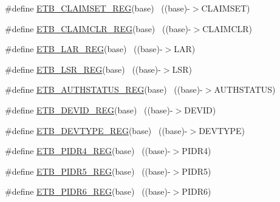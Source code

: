 \begin{DoxyCompactItemize}
\item 
\#define \hyperlink{group___e_t_b___register___accessor___macros_ga53774f9d5d7a5be087ae544a728f4402}{E\+T\+B\+\_\+\+C\+L\+A\+I\+M\+S\+E\+T\+\_\+\+R\+EG}(base)                                  ~((base)-\/$>$C\+L\+A\+I\+M\+S\+ET)
\item 
\#define \hyperlink{group___e_t_b___register___accessor___macros_gab07e0a6927dc1764c98232f6f99b3234}{E\+T\+B\+\_\+\+C\+L\+A\+I\+M\+C\+L\+R\+\_\+\+R\+EG}(base)                                  ~((base)-\/$>$C\+L\+A\+I\+M\+C\+LR)
\item 
\#define \hyperlink{group___e_t_b___register___accessor___macros_gac75124828507bbcd9df24ab8a4084709}{E\+T\+B\+\_\+\+L\+A\+R\+\_\+\+R\+EG}(base)                                            ~((base)-\/$>$L\+AR)
\item 
\#define \hyperlink{group___e_t_b___register___accessor___macros_gaca7b71b796d591bb249270a2af85ca23}{E\+T\+B\+\_\+\+L\+S\+R\+\_\+\+R\+EG}(base)                                            ~((base)-\/$>$L\+SR)
\item 
\#define \hyperlink{group___e_t_b___register___accessor___macros_gaa3258c2fe535e526cb4583178e67f1fc}{E\+T\+B\+\_\+\+A\+U\+T\+H\+S\+T\+A\+T\+U\+S\+\_\+\+R\+EG}(base)                              ~((base)-\/$>$A\+U\+T\+H\+S\+T\+A\+T\+US)
\item 
\#define \hyperlink{group___e_t_b___register___accessor___macros_gafa2a6c499747c9b7b95b97f0af8eead8}{E\+T\+B\+\_\+\+D\+E\+V\+I\+D\+\_\+\+R\+EG}(base)                                        ~((base)-\/$>$D\+E\+V\+ID)
\item 
\#define \hyperlink{group___e_t_b___register___accessor___macros_gac36252d853b0600a7aa961d72babf69c}{E\+T\+B\+\_\+\+D\+E\+V\+T\+Y\+P\+E\+\_\+\+R\+EG}(base)                                    ~((base)-\/$>$D\+E\+V\+T\+Y\+PE)
\item 
\#define \hyperlink{group___e_t_b___register___accessor___macros_gaabd66745bb19a195e8a4f40926b19608}{E\+T\+B\+\_\+\+P\+I\+D\+R4\+\_\+\+R\+EG}(base)                                        ~((base)-\/$>$P\+I\+D\+R4)
\item 
\#define \hyperlink{group___e_t_b___register___accessor___macros_gad0954187e3a433782aab3e6ea98596a2}{E\+T\+B\+\_\+\+P\+I\+D\+R5\+\_\+\+R\+EG}(base)                                        ~((base)-\/$>$P\+I\+D\+R5)
\item 
\#define \hyperlink{group___e_t_b___register___accessor___macros_gae3afa52ff893335bfb09b29f48ea3415}{E\+T\+B\+\_\+\+P\+I\+D\+R6\+\_\+\+R\+EG}(base)                                        ~((base)-\/$>$P\+I\+D\+R6)

\end{DoxyCompactItemize}
